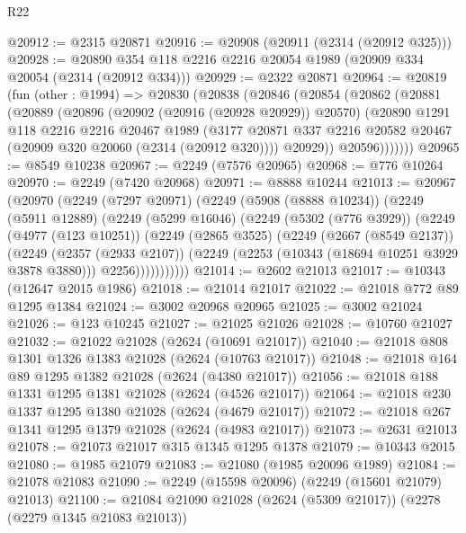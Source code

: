 \begin{lexlean}{R22}
\begin{coremodule}
@20912 := @2315 @20871
@20916 := @20908 (@20911 (@2314 (@20912 @325)))
@20928 := @20890 @354 @118 @2216 @2216 @20054 @1989 (@20909 @334 @20054 (@2314 (@20912 @334)))
@20929 := @2322 @20871
@20964 := @20819
    (fun (other : @1994) =>
    @20830
      (@20838
        (@20846
          (@20854
            (@20862
              (@20881
                (@20889
                  (@20896
                    (@20902 (@20916 (@20928 @20929)) @20570)
                    (@20890
                      @1291
                      @118
                      @2216
                      @2216
                      @20467
                      @1989
                      (@3177
                        @20871
                        @337
                        @2216
                        @20582
                        @20467
                        (@20909 @320 @20060 (@2314 (@20912 @320))))
                      @20929))
                  @20596)))))))
@20965 := @8549 @10238
@20967 := @2249 (@7576 @20965)
@20968 := @776 @10264
@20970 := @2249 (@7420 @20968)
@20971 := @8888 @10244
@21013 := @20967
    (@20970
      (@2249
        (@7297 @20971)
        (@2249
          (@5908 (@8888 @10234))
          (@2249
            (@5911 @12889)
            (@2249
              (@5299 @16046)
              (@2249
                (@5302 (@776 @3929))
                (@2249
                  (@4977 (@123 @10251))
                  (@2249
                    (@2865 @3525)
                    (@2249
                      (@2667 (@8549 @2137))
                      (@2249
                        (@2357 (@2933 @2107))
                        (@2249 (@2253 (@10343 (@18694 @10251 @3929 @3878 @3880))) @2256)))))))))))
@21014 := @2602 @21013
@21017 := @10343 (@12647 @2015 @1986)
@21018 := @21014 @21017
@21022 := @21018 @772 @89 @1295 @1384
@21024 := @3002 @20968 @20965
@21025 := @3002 @21024
@21026 := @123 @10245
@21027 := @21025 @21026
@21028 := @10760 @21027
@21032 := @21022 @21028 (@2624 (@10691 @21017))
@21040 := @21018 @808 @1301 @1326 @1383 @21028 (@2624 (@10763 @21017))
@21048 := @21018 @164 @89 @1295 @1382 @21028 (@2624 (@4380 @21017))
@21056 := @21018 @188 @1331 @1295 @1381 @21028 (@2624 (@4526 @21017))
@21064 := @21018 @230 @1337 @1295 @1380 @21028 (@2624 (@4679 @21017))
@21072 := @21018 @267 @1341 @1295 @1379 @21028 (@2624 (@4983 @21017))
@21073 := @2631 @21013
@21078 := @21073 @21017 @315 @1345 @1295 @1378
@21079 := @10343 @2015
@21080 := @1985 @21079
@21083 := @21080 (@1985 @20096 @1989)
@21084 := @21078 @21083
@21090 := @2249 (@15598 @20096) (@2249 (@15601 @21079) @21013)
@21100 := @21084 @21090 @21028 (@2624 (@5309 @21017)) (@2278 (@2279 @1345 @21083 @21013))

\end{coremodule}
\end{lexlean}
